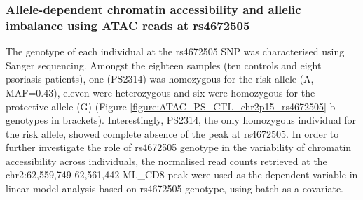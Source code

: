 
\subsubsection{Allele-dependent chromatin accessibility and allelic imbalance using ATAC reads at rs4672505}
The genotype of each individual at the rs4672505 SNP was characterised using Sanger sequencing. Amongst the eighteen samples (ten controls and eight psoriasis patients), one (PS2314) was homozygous for the risk allele (A, MAF=0.43), eleven were heterozygous and six were homozygous for the protective allele (G) (Figure \ref{figure:ATAC_PS_CTL_chr2p15_rs4672505} b genotypes in brackets). Interestingly, PS2314, the only homozygous individual for the risk allele, showed complete absence of the peak at rs4672505. In order to further investigate the role of rs4672505 genotype in the variability of chromatin accessibility across individuals, the normalised read counts retrieved at the chr2:62,559,749-62,561,442 ML\_CD8 peak were used as the dependent variable in linear model analysis based on rs4672505 genotype, using batch as a covariate. 




